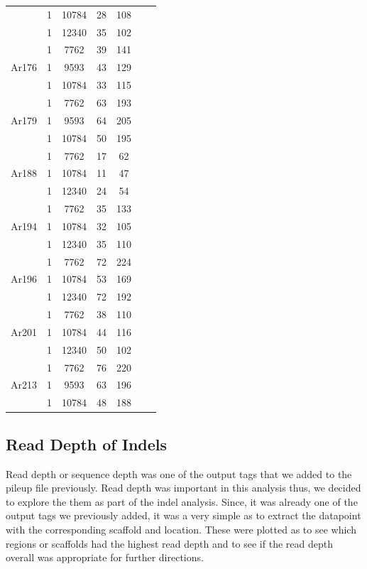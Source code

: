 \begin{table}[H]
\begin{center}
\begin{singlespace}
{\begin{tabular}{ |c|c|c|c|c|c|c| }
					& 1 & 10784 & 28 & 108  \\ 
					& 1 & 12340 & 35 & 102 \\ 
					\hline
					\multirow{3}{4em}{Ar176} & 1 & 7762 & 39 & 141 \\ 
					& 1 & 9593 & 43 & 129  \\ 
					& 1 & 10784 & 33 & 115 \\ 
					\hline
					\multirow{3}{4em}{Ar179} & 1 & 7762 & 63 & 193 \\ 
					& 1 & 9593 & 64 & 205  \\ 
					& 1 & 10784 & 50 & 195 \\ 
					\hline
					\multirow{3}{4em}{Ar188} & 1 & 7762 & 17 & 62 \\ 
					& 1 & 10784 & 11 & 47  \\ 
					& 1 & 12340 & 24 & 54 \\ 
					\hline
					\multirow{3}{4em}{Ar194} & 1 & 7762 & 35 & 133 \\ 
					& 1 & 10784 & 32 & 105  \\ 
					& 1 & 12340 & 35 & 110 \\ 
					\hline
					\multirow{3}{4em}{Ar196} & 1 & 7762 & 72 & 224 \\ 
					& 1 & 10784 & 53 & 169  \\ 
					& 1 & 12340 & 72 & 192 \\ 
					\hline
					\multirow{3}{4em}{Ar201} & 1 & 7762 & 38 & 110 \\ 
					& 1 & 10784 & 44 & 116  \\ 
					& 1 & 12340 & 50 & 102 \\ 
					\hline
					\multirow{3}{4em}{Ar213} & 1 & 7762 & 76 & 220 \\ 
					& 1 & 9593 & 63 & 196  \\ 
					& 1 & 10784 & 48 & 188 \\ 
					\hline
				\end{tabular}
			}
		\end{singlespace}
	\end{center}
\end{table}

\subsection{Read Depth of Indels}

Read depth or sequence depth was one of the output tags that we added to the pileup file previously. Read depth was important in this analysis thus, we decided to explore the them as part of the indel analysis. Since, it was already one of the output tags we previously added, it was a very simple as to extract the datapoint with the corresponding scaffold and location. These were plotted as to see which regions or scaffolds had the highest read depth and to see if the read depth overall was appropriate for further directions.

